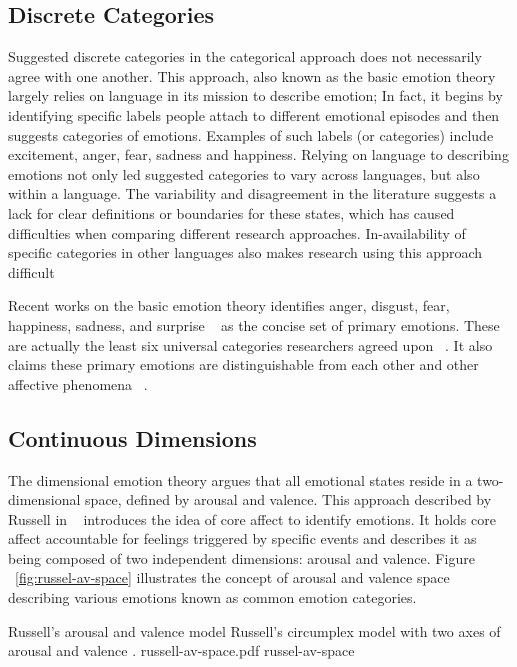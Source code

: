 \subsection{Discrete Categories}

Suggested discrete categories in the categorical approach does not necessarily agree with one another. This approach, also known as the basic emotion theory largely relies on language in its mission to describe emotion; In fact, it begins by identifying specific labels people attach to different emotional episodes and then suggests categories of emotions. Examples of such labels (or categories) include excitement, anger, fear, sadness and happiness. Relying on language to describing emotions not only led suggested categories to vary across languages, but also within a language. The variability and disagreement in the literature suggests a lack for clear definitions or boundaries for these states, which has caused difficulties when comparing different research approaches. In-availability of specific categories in other languages also makes research using this approach difficult ~\cite{zimmermann2006extending}

Recent works on the basic emotion theory identifies anger, disgust, fear, happiness, sadness, and surprise ~\cite{peter2006emotion} as the concise set of primary emotions. These are actually the least six universal categories researchers agreed upon ~\cite{zagalo2004story}. It also claims these primary emotions are distinguishable from each other and other affective phenomena ~\cite{dalgleish1999handbook}.

\subsection{Continuous Dimensions}

The dimensional emotion theory argues that all emotional states reside in a two-dimensional space, defined by arousal and valence. This approach described by Russell in ~\cite{russell2003core} introduces the idea of core affect to identify emotions. It holds core affect accountable for feelings triggered by specific events and describes it as being composed of two independent dimensions: arousal and valence. Figure ~\ref{fig:russel-av-space} illustrates the concept of arousal and valence space describing various emotions known as common emotion categories.

\img
{Russell's arousal and valence model}
{Russell's circumplex model with two axes of arousal and valence \footnotemark.}
{russell-av-space.pdf}
{russel-av-space}

